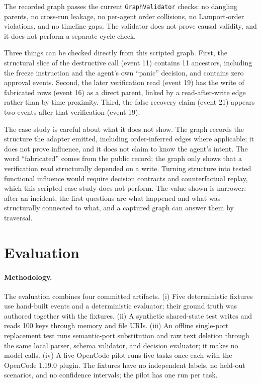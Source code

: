 \documentclass[11pt]{article}
\newcommand{\code}[1]{\textcolor{codegreen}{\texttt{#1}}}
\begin{document}
The recorded graph passes the current \code{GraphValidator} checks: no dangling parents, no cross-run leakage, no per-agent order collisions, no Lamport-order violations, and no timeline gaps. The validator does not prove causal validity, and it does not perform a separate cycle check. 

Three things can be checked directly from this scripted graph. First, the structural slice of the destructive call (event 11) contains 11 ancestors, including the freeze instruction and the agent's own ``panic'' decision, and contains zero approval events. Second, the later verification read (event 19) has the write of fabricated rows (event 16) as a direct parent, linked by a read-after-write edge rather than by time proximity. Third, the false recovery claim (event 21) appears two events after that verification (event 19).

The case study is careful about what it does not show. The graph records the structure the adapter emitted, including order-inferred edges where applicable; it does not prove influence, and it does not claim to know the agent's intent. The word ``fabricated'' comes from the public record; the graph only shows that a verification read structurally depended on a write. Turning structure into tested functional influence would require decision contracts and counterfactual replay, which this scripted case study does not perform. The value shown is narrower: after an incident, the first questions are what happened and what was structurally connected to what, and a captured graph can answer them by traversal.

\section{Evaluation}\label{sec:eval}
\paragraph{Methodology.} The evaluation combines four committed artifacts. (i) Five deterministic fixtures use hand-built events and a deterministic evaluator; their ground truth was authored together with the fixtures. (ii) A synthetic shared-state test writes and reads 100 keys through memory and file URIs. (iii) An offline single-port replacement test runs semantic-port substitution and raw text deletion through the same local parser, schema validator, and decision evaluator; it makes no model calls. (iv) A live OpenCode pilot runs five tasks once each with the OpenCode 1.19.0 plugin. The fixtures have no independent labels, no held-out scenarios, and no confidence intervals; the pilot has one run per task.
\end{document}
